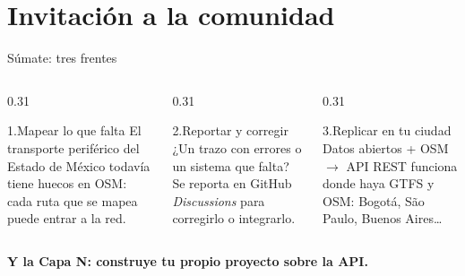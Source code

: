 \section{Invitación a la comunidad}
\begin{frame}{Súmate: tres frentes}
  \begin{columns}[T]
    \begin{column}{0.31\textwidth}
      \begin{exampleblock}{\footnotesize 1.\enspace Mapear lo que falta}
        \scriptsize El transporte periférico del Estado de México todavía tiene
        huecos en OSM: cada ruta que se mapea puede entrar a la red.
      \end{exampleblock}
    \end{column}
    \begin{column}{0.31\textwidth}
      \begin{block}{\footnotesize 2.\enspace Reportar y corregir}
        \scriptsize ¿Un trazo con errores o un sistema que falta? Se reporta en
        GitHub \textit{Discussions} para corregirlo o integrarlo.
      \end{block}
    \end{column}
    \begin{column}{0.31\textwidth}
      \begin{alertblock}{\footnotesize 3.\enspace Replicar en tu ciudad}
        \scriptsize Datos abiertos + OSM $\rightarrow$ API REST funciona donde haya
        GTFS y OSM: Bogotá, São Paulo, Buenos Aires…
      \end{alertblock}
    \end{column}
  \end{columns}

  \vspace{0.5cm}
  \centering
  {\small\bfseries\color{SotmVerde} Y la Capa N: construye tu propio proyecto sobre la API.}
\end{frame}

